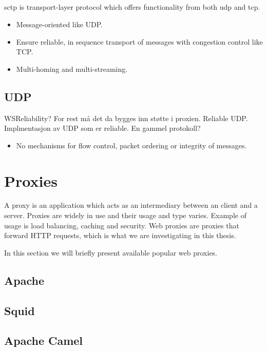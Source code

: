 \subsection{}

\gls{sctp} is transport-layer protocol which offers functionality from both \gls{udp} and \gls{tcp}.
\begin{itemize}
    \item Message-oriented like UDP.
    \item Ensure reliable, in sequence transport of messages with congestion control like TCP.
    \item Multi-homing and multi-streaming.
\end{itemize}




\subsection{UDP}
WSReliability? For rest må det da bygges inn støtte i proxien.
Reliable UDP. Implmentasjon av UDP som er reliable. En gammel protokoll?
\begin{itemize}
    \item No mechanisms for flow control, packet ordering or integrity of
    messages.
\end{itemize}

\section{Proxies}

A proxy is an application which acts as an intermediary between an client and a
server. Proxies are widely in use and their usage and type varies. Example of
usage is load balancing, caching and security. Web proxies are proxies that
forward HTTP requests, which is what we are investigating in this thesis.

In this section we will briefly present available popular web proxies.

\subsection{Apache}

\subsection{Squid}

\subsection{Apache Camel}

